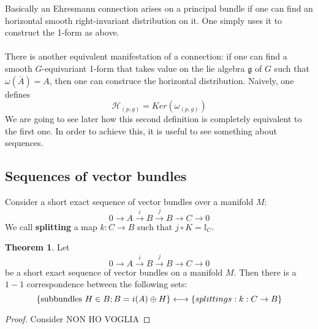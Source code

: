 \documentclass[12pt,a4paper]{report}
\theoremstyle{definition}
\theoremstyle{Theorem}
\newtheorem{Theo}[Def]{Theorem}
\theoremstyle{definition}
\theoremstyle{definition}
\begin{document}
		Basically an Ehresmann connection arises on a principal bundle if one can find an horizontal smooth right-invariant distribution on it. One simply uses it to construct the 1-form as above.\\
		\\
		There is another equivalent manifestation of a connection: if one can find a smooth $G$-equivariant 1-form that takes value on the lie algebra $\mathfrak{g}$ of $G$ such that $\omega(\bar{A})=A$, then one can construce the horizontal distribution. Naively, one defines $$\mathcal{H}_{(p,g)}=Ker(\omega_{(p,g)})$$
		We are going to see later how this second definition is completely equivalent to the first one. In order to achieve this, it is useful to see something about sequences.
		\subsection{Sequences of vector bundles}
		Consider a short exact sequence of vector bundles over a manifold $M$:
		$$0\rightarrow A\xrightarrow{i}B\xrightarrow{j}B\rightarrow C\rightarrow0$$
		We call \textbf{splitting} a map $k:C\rightarrow B$ such that $j\circ K=\mathbb{I}_C$.
		\begin{Theo}
			Let
			$$0\rightarrow A\xrightarrow{i}B\xrightarrow{j}B\rightarrow C\rightarrow0$$
			be a short exact sequence of vector bundles on a manifold $M$. Then there is a $1-1$ correspondence between the following sets:
			$$\{\hbox{subbundles } H\in B;B=i(A)\oplus H\}\longleftrightarrow\{splittings: k:C\rightarrow B\}$$
		\end{Theo}
		\begin{proof}
			Consider NON HO VOGLIA
		\end{proof}
\end{document}

